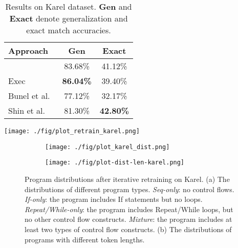\begin{table}[t]
\begin{minipage}{0.45\linewidth}
\caption{\small Results on Karel dataset. \textbf{Gen} and \textbf{Exact} denote generalization and exact match accuracies.}
\label{tab:karel}
\begin{tabular}{lcc}
\toprule
\textbf{Approach}  & \textbf{Gen} & \textbf{Exact} \\
\midrule
\ours{} & 83.68\% & 41.12\% \\
Exec~\cite{chen2018execution} & \textbf{86.04\%} & 39.40\% \\
Bunel et al.~\cite{bunel2018leveraging} & 77.12\% & 32.17\% \\
Shin et al.~\cite{shin2018improving} & 81.30\% & \textbf{42.80\%} \\
\bottomrule
\end{tabular}
\end{minipage}
\begin{minipage}{0.5\linewidth}
    \centering
    \texttt{[image: ./fig/plot\_retrain\_karel.png]}
    \label{fig:retrain-karel-acc}
\end{minipage}
\vspace{-0.3in}
\end{table}

\begin{figure}[t]
    \centering
    \begin{subfigure}[t]{0.45\linewidth}
    \texttt{[image: ./fig/plot\_karel\_dist.png]}
    \caption{}
    \label{fig:retrain-karel-dist}
    \end{subfigure}
    \begin{subfigure}[t]{0.45\linewidth}
    \texttt{[image: ./fig/plot-dist-len-karel.png]}
    \caption{}
    \label{fig:karel-dist-len}
    \end{subfigure}
    \vspace{-0.1in}
    \caption{\small Program distributions after iterative retraining on Karel. (a) The distributions of different program types. \emph{Seq-only}: no control flows. \emph{If-only}: the program includes If statements but no loops. \emph{Repeat/While-only}: the program includes Repeat/While loops, but no other control flow constructs. \emph{Mixture}: the program includes at least two types of control flow constructs. (b) The distributions of programs with different token lengths.  }
    \label{fig:retrain-karel}
    \vspace{-0.2in}
\end{figure}

